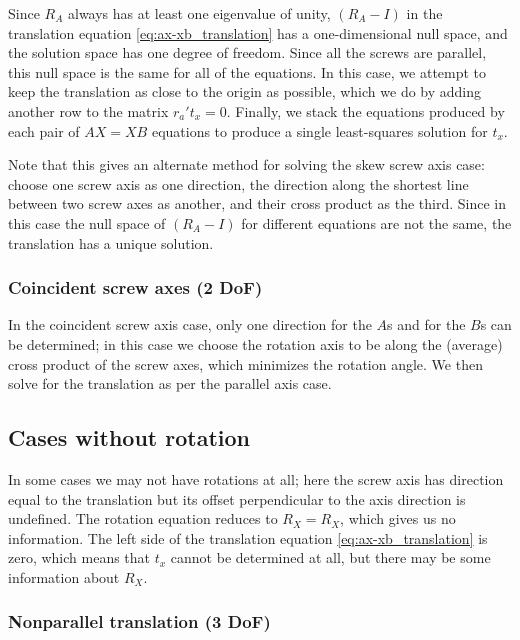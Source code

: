 Since $R_A$ always has at least one eigenvalue of unity, 
$\left(R_A - I \right)$ in the translation equation \ref{eq:ax-xb_translation} 
has a one-dimensional null space, and the solution space has one degree of freedom.
Since all the screws are parallel, this null space is the same for all of the equations.
In this case, we attempt to keep the translation as close to the origin as possible,
which we do by adding another row to the matrix $r_a' t_x = 0$.
Finally, we stack the equations produced by each pair of $AX = XB$ equations to produce a single
least-squares solution for $t_x$.

Note that this gives an alternate method for solving the skew screw axis case: choose one screw axis
as one direction, the direction along the shortest line between two screw axes as another, and their 
cross product as the third. Since in this case the null space of $\left(R_A - I \right)$ for
different equations are not the same, the translation has a unique solution.

\subsubsection{Coincident screw axes (2 DoF)}

In the coincident screw axis case, only one direction for the $A$s and for the $B$s can be determined;
in this case we choose the rotation axis to be along the (average) cross product of the screw axes,
which minimizes the rotation angle. We then solve for the translation as per the parallel axis case.

\subsection{Cases without rotation}

In some cases we may not have rotations at all; here the screw axis has direction equal to the translation
but its offset perpendicular to the axis direction is undefined. 
The rotation equation \label{eq:ax-xb_rotation} reduces to $R_X = R_X$, which gives us no information. 
The left side of the translation equation \ref{eq:ax-xb_translation} is zero, which means that $t_x$
cannot be determined at all, but there may be some information about $R_X$.

\subsubsection{Nonparallel translation (3 DoF)}

